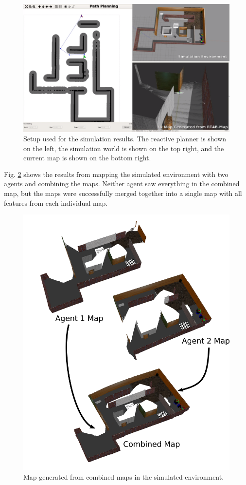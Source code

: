 \documentclass[letterpaper, 10 pt, conference]{ieeeconf}  %
\begin{document}
\begin{figure}
\centering
\includegraphics[width=1.0\linewidth]{sim_setup}
\caption{Setup used for the simulation results. The reactive planner is shown on the left, the simulation world is shown on the top right, and the current map is shown on the bottom right.}
\label{fig:sim_setup}
\end{figure}

Fig. \ref{fig:sim_map} shows the results from mapping the simulated environment with two agents and combining the maps. Neither agent saw everything in the combined map, but the maps were successfully merged together into a single map with all features from each individual map.

\begin{figure}
\centering
\includegraphics[width=1.0\linewidth]{sim_map}
\caption{Map generated from combined maps in the simulated environment.}
\label{fig:sim_map}
\end{figure}
\end{document}
